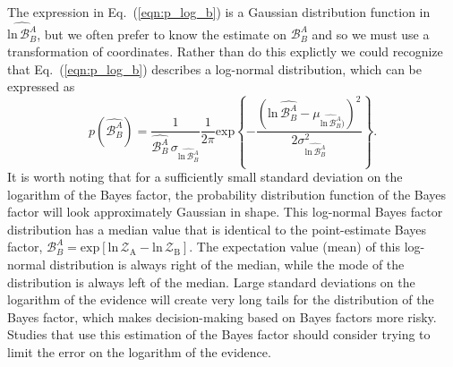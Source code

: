 The expression in Eq.~(\ref{eqn:p_log_b}) is a Gaussian distribution function in $\widehat{\mathrm{ln} \, \mathcal{B}^A_B}$, but we often prefer to know the estimate on $\mathcal{B}^A_B$ and so we must use a transformation of coordinates. Rather than do this explictly we could recognize that Eq.~(\ref{eqn:p_log_b}) describes a log-normal distribution, which can be expressed as
\begin{equation}
    p(\widehat{\mathcal{B}^A_B}) = \frac{1}{\widehat{\mathcal{B}^A_B} \, \sigma_{\widehat{\mathrm{ln} \, \mathcal{B}^A_B}}} \frac{1}{2\pi} \mathrm{exp} \left \{-\frac{\left(\mathrm{ln} \, \widehat{\mathcal{B}^A_B} - \mu_{\widehat{\mathrm{ln} \, \mathcal{B}^A_B})}\right)^2} {2 \sigma^2_{\widehat{\mathrm{ln} \, \mathcal{B}^A_B}}}  \right\}.
\end{equation}
It is worth noting that for a sufficiently small standard deviation on the logarithm of the Bayes factor, the probability distribution function of the Bayes factor will look approximately Gaussian in shape. This log-normal Bayes factor distribution has a median value that is identical to the point-estimate Bayes factor, $\mathcal{B}^A_B = \mathrm{exp} \left[\mathrm{ln} \, \mathcal{Z}_{\mathrm{A}} - \mathrm{ln} \, \mathcal{Z}_{\mathrm{B}} \right]$. The expectation value (mean) of this log-normal distribution is always right of the median, while the mode of the distribution is always left of the median. Large standard deviations on the logarithm of the evidence will create very long tails for the distribution of the Bayes factor, which makes decision-making based on Bayes factors more risky. Studies that use this estimation of the Bayes factor should consider trying to limit the error on the logarithm of the evidence.


